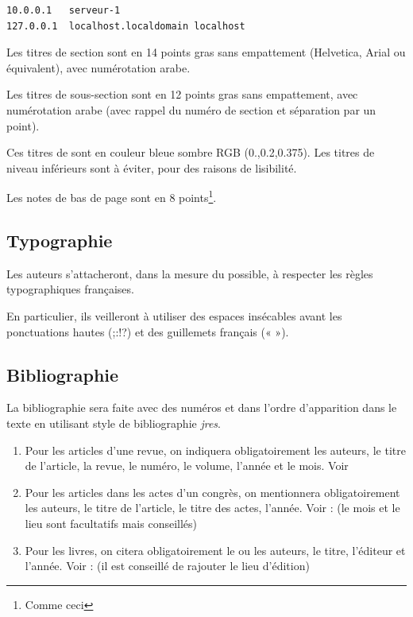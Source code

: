 \documentclass[city=Montpellier,year=2013]{jres}
\begin{document}
\begin{lstlisting}
10.0.0.1   serveur-1
127.0.0.1  localhost.localdomain localhost
\end{lstlisting}

Les titres de section sont en 14 points gras sans empattement
(Helvetica, Arial ou équivalent), avec numérotation arabe.

Les titres de sous-section sont en 12 points gras sans empattement,
avec numérotation arabe (avec rappel du numéro de section et
séparation par un point).

Ces titres de sont en couleur bleue sombre RGB (0.,0.2,0.375).  Les
titres de niveau inférieurs sont à éviter, pour des raisons de
lisibilité.

Les notes de bas de page sont en 8 points\footnote{Comme ceci}.

\subsection{Typographie}

Les auteurs s'attacheront, dans la mesure du possible, à respecter les
règles typographiques françaises.

En particulier, ils veilleront à utiliser des espaces insécables avant
les ponctuations hautes (;:!?) et des guillemets français (« »).

\subsection{Bibliographie}

La bibliographie sera faite avec des numéros et dans l'ordre
d'apparition dans le texte en utilisant style de bibliographie
\emph{jres}.

\begin{enumerate}

\item Pour les articles d'une revue, on indiquera obligatoirement les
  auteurs, le titre de l'article, la revue, le numéro, le volume,
  l'année et le mois. Voir \cite{exemple1}

\item Pour les articles dans les actes d'un congrès, on mentionnera
  obligatoirement les auteurs, le titre de l'article, le titre des
  actes, l'année. Voir : \cite{exemple2} (le mois et le lieu sont
  facultatifs mais conseillés)

\item Pour les livres, on citera obligatoirement le ou les auteurs, le
  titre, l'éditeur et l'année. Voir : \cite{exemple3} (il est conseillé de
  rajouter le lieu d'édition)

\end{enumerate}
\end{document}
